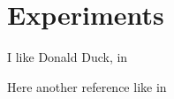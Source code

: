 \section{Experiments}

I like Donald Duck, in \cite{leal2018web}

Here another reference like in \cite*{leal2018web}